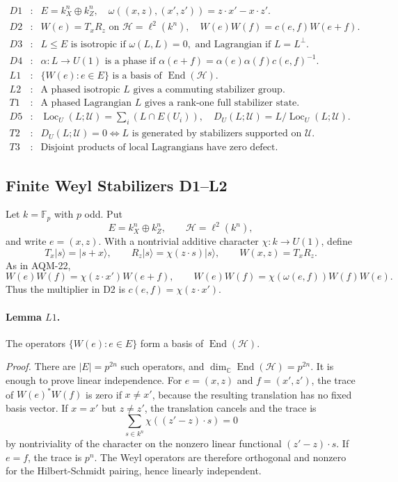 \[
\begin{array}{rcl}
D1&:&E=k^n_X\oplus k^n_Z,\quad
      \omega((x,z),(x',z'))=z\cdot x'-x\cdot z'.\\
D2&:&W(e)=T_xR_z\text{ on }\mathcal H=\ell^2(k^n),\quad
      W(e)W(f)=c(e,f)W(e+f).\\
D3&:&L\leq E\text{ is isotropic if }\omega(L,L)=0,
      \text{ and Lagrangian if }L=L^\perp.\\
D4&:&\alpha:L\to U(1)\text{ is a phase if }
      \alpha(e+f)=\alpha(e)\alpha(f)c(e,f)^{-1}.\\
L1&:&\{W(e):e\in E\}\text{ is a basis of }\operatorname{End}(\mathcal H).\\
L2&:&\text{A phased isotropic }L\text{ gives a commuting stabilizer group}.\\
T1&:&\text{A phased Lagrangian }L\text{ gives a rank-one full stabilizer state}.\\
D5&:&\operatorname{Loc}_U(L;\mathcal U)=
      \sum_i(L\cap E(U_i)),\quad
      D_U(L;\mathcal U)=L/\operatorname{Loc}_U(L;\mathcal U).\\
T2&:&D_U(L;\mathcal U)=0
      \Longleftrightarrow
      L\text{ is generated by stabilizers supported on }\mathcal U.\\
T3&:&\text{Disjoint products of local Lagrangians have zero defect.}
\end{array}
\]

\subsection{Finite Weyl Stabilizers D1--L2}

Let \(k=\mathbb F_p\) with \(p\) odd.  Put
\[
  E=k^n_X\oplus k^n_Z,\qquad
  \mathcal H=\ell^2(k^n),
\]
and write \(e=(x,z)\).  With a nontrivial additive character
\(\chi:k\to U(1)\), define
\[
  T_x|s\rangle=|s+x\rangle,\qquad
  R_z|s\rangle=\chi(z\cdot s)|s\rangle,\qquad
  W(x,z)=T_xR_z .
\]
As in AQM-22,
\[
  W(e)W(f)=\chi(z\cdot x')W(e+f),
  \qquad
  W(e)W(f)=\chi(\omega(e,f))W(f)W(e).
\]
Thus the multiplier in D2 is \(c(e,f)=\chi(z\cdot x')\).

\paragraph{Lemma \(L1\).}
The operators \(\{W(e):e\in E\}\) form a basis of
\(\operatorname{End}(\mathcal H)\).

\emph{Proof.}
There are \(|E|=p^{2n}\) such operators, and
\(\dim_\mathbb C\operatorname{End}(\mathcal H)=p^{2n}\).  It is enough to
prove linear independence.  For \(e=(x,z)\) and \(f=(x',z')\), the trace of
\(W(e)^*W(f)\) is zero if \(x\ne x'\), because the resulting translation has
no fixed basis vector.  If \(x=x'\) but \(z\ne z'\), the translation cancels
and the trace is
\[
  \sum_{s\in k^n}\chi((z'-z)\cdot s)=0
\]
by nontriviality of the character on the nonzero linear functional
\((z'-z)\cdot s\).  If \(e=f\), the trace is \(p^n\).  The Weyl operators are
therefore orthogonal and nonzero for the Hilbert-Schmidt pairing, hence
linearly independent.

